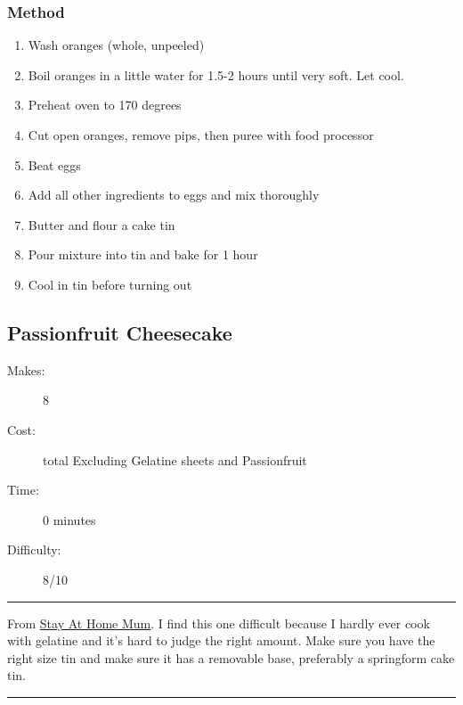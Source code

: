 \documentclass[]{article}
\begin{document}
\subsubsection*{\Large Method}
\begin{enumerate}[font=\huge\color{accent}]
	\item Wash oranges (whole, unpeeled)
	\item Boil oranges in a little water for 1.5-2 hours until very soft. Let cool.
	\item Preheat oven to 170 degrees
	\item Cut open oranges, remove pips, then puree with food processor
	\item Beat eggs
	\item Add all other ingredients to eggs and mix thoroughly
	\item Butter and flour a cake tin
	\item Pour mixture into tin and bake for 1 hour
	\item Cool in tin before turning out
\end{enumerate}
\newpage
{}\label{rec:Passionfruit Cheesecake}
\subsection*{\center\huge Passionfruit Cheesecake}
\begin{description}
\item[Makes:] 8 
\item[Cost:]  total Excluding Gelatine sheets and Passionfruit
\item[Time:] 0 minutes
\item[Difficulty:] 8/10
\end{description}
\vspace{0.2cm}\hrule\vspace{0.5cm}
\begin{adjustwidth}{0.5 cm}{0.5 cm}

From \href{https://www.stayathomemum.com.au/recipes/no-bake-passionfruit-jelly-cheesecake/}{Stay At Home Mum}. I find this one difficult because I hardly ever cook with gelatine and it’s hard to judge the right amount. Make sure you have the right size tin and make sure it has a removable base, preferably a springform cake tin. \hfill{}\color{black}

\end{adjustwidth}
\vspace{0.5cm}\hrule
\end{document}
